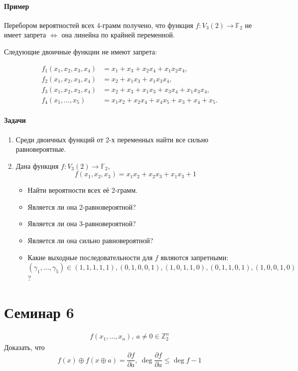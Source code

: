 \documentclass[a4paper,12pt]{article}
\newcommand{\seminary}[1]{\pagebreak\section*{#1}
	\addcontentsline{toc}{section}{#1}
}
\newcommand{\xor}{\oplus}
\newcommand{\partialfrac}[2]{\frac{\partial #1}{\partial #2}}
\newcommand{\ZZ}{\mathbb{Z}}
\begin{document}
	\paragraph{Пример}
	Перебором вероятностей всех 4-грамм получено, что функция $f: V_3(2) \rightarrow \mathbb{F}_2$ не имеет запрета $\Leftrightarrow$ она линейна по крайней переменной.

	Следующие двоичные функции не имеют запрета:

	$$
	\begin{aligned}
		f_1(x_1, x_2, x_3, x_4) &= x_1 + x_3 + x_2x_4 + x_1x_2x_4,\\
		f_2(x_1, x_2, x_3, x_4) &= x_2 + x_1x_3 + x_1x_3x_4,\\
		f_3(x_1, x_2, x_3, x_4) &= x_2 + x_3 + x_1x_3 + x_3x_4 + x_1x_3x_4, \\
		f_4(x_1, ..., x_5) &= x_1x_2 + x_2x_4 + x_4x_5 + x_3 + x_4 + x_5.
	\end{aligned}
	$$

	\paragraph{Задачи}
	\begin{enumerate}
		\item Среди двоичных функций от 2-х переменных найти все сильно равновероятные.
		\item Дана функция $f: V_3(2) \rightarrow \mathbb{F}_2$, \[ f(x_1, x_2, x_3) = x_1x_2 + x_2x_3 + x_1x_3 + 1 \]
		\begin{itemize}
			\item Найти вероятности всех её 2-грамм.
			\item Является ли она 2-равновероятной?
			\item Является ли она 3-равновероятной?
			\item Является ли она сильно равновероятной?
			\item Какие выходные последовательности для $f$ являются запретными: $(\gamma_1, ..., \gamma_5) \in {(1,1,1,1,1), (0,1,0,0,1), (1,0,1,1,0), (0,1,1,0,1), (1,0,0,1,0)}$ ?
		\end{itemize}
	\end{enumerate}

	
	\seminary{Семинар 6}
	
	$$
	\begin{aligned}
		f(x_1, ..., x_n), ~ a \not = 0 \in \ZZ_2^n
	\end{aligned}
	$$
	Доказать, что
	$$
	f(x) \xor f(x \xor a) = \partialfrac{f}{a}, ~ \deg \partialfrac{f}{a} \le \deg f -1
	$$
	
\end{document}

